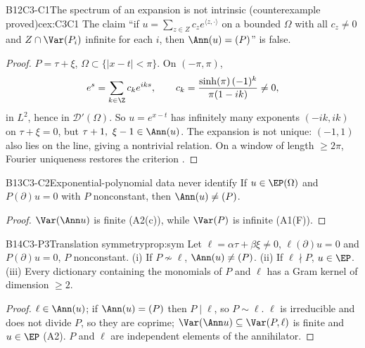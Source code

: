 \begin{dimcard}{B12}{C3-C1}{The spectrum of an expansion is not intrinsic}{\falsest{} (counterexample proved)}{cex:C3C1}
The claim ``if $u=\sum_{z\in Z}c_ze^{\langle z,\cdot\rangle}$ on a bounded $\Omega$ with all $c_z\ne0$ and $Z\cap\Var(P_i)$ infinite for each $i$, then $\Ann(u)=(P)$'' is false.
\end{dimcard}
\begin{proof}
$P=\tau+\xi$, $\Omega\subset\{|x-t|<\pi\}$. On $(-\pi,\pi)$,
\[
e^s=\sum_{k\in\Z}c_ke^{iks},\qquad c_k=\frac{\sinh(\pi)\,(-1)^k}{\pi(1-ik)}\ne0,
\]
in $L^2$, hence in $\mathcal D'(\Omega)$. So $u=e^{x-t}$ has infinitely many exponents $(-ik,ik)$ on $\tau+\xi=0$, but $\tau+1,\ \xi-1\in\Ann(u)$.
The expansion is not unique: $(-1,1)$ also lies on the line, giving a nontrivial relation. On a window of length $\ge2\pi$, Fourier uniqueness restores the criterion .
\end{proof}

\begin{dimcard}{B13}{C3-C2}{Exponential-polynomial data never identify}{\pw}{}
If $u\in\EP(\Omega)$ and $P(\partial)u=0$ with $P$ nonconstant, then $\Ann(u)\ne(P)$.
\end{dimcard}
\begin{proof}
$\Var(\Ann u)$ is finite (A2(c)), while $\Var(P)$ is infinite (A1(F)).
\end{proof}

\begin{dimcard}{B14}{C3-P3}{Translation symmetry}{\pw}{prop:sym}
Let $\ell=\alpha\tau+\beta\xi\ne0$, $\ell(\partial)u=0$ and $P(\partial)u=0$, $P$ nonconstant. (i) If $P\not\sim\ell$, $\Ann(u)\ne(P)$. (ii) If $\ell\nmid P$, $u\in\EP$. (iii) Every dictionary containing the monomials of $P$ and $\ell$ has a Gram kernel of dimension $\ge2$.
\end{dimcard}
\begin{proof}
$\ell\in\Ann(u)$; if $\Ann(u)=(P)$ then $P\mid\ell$, so $P\sim\ell$.
$\ell$ is irreducible and does not divide $P$, so they are coprime; $\Var(\Ann u)\subseteq\Var(P,\ell)$ is finite and $u\in\EP$ (A2).
$P$ and $\ell$ are independent elements of the annihilator.
\end{proof}

